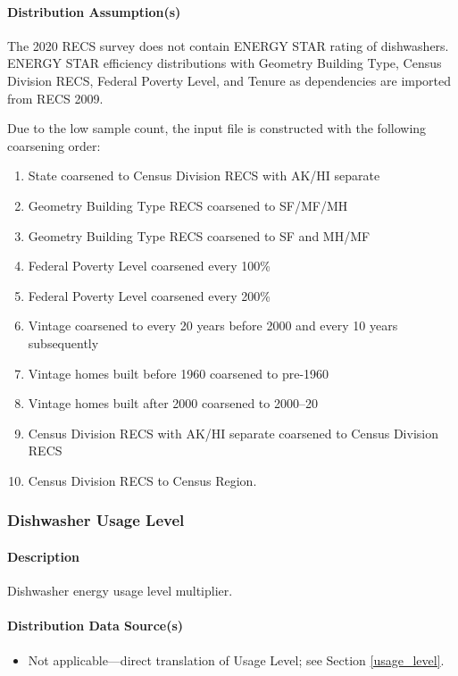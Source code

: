 \paragraph{Distribution Assumption(s)}
The 2020 RECS survey does not contain ENERGY STAR rating of dishwashers. ENERGY STAR efficiency distributions with Geometry Building Type, Census Division RECS, Federal Poverty Level, and Tenure as dependencies are imported from RECS 2009.

Due to the low sample count, the input file is constructed with the following coarsening order:
\begin{enumerate}
    \item State coarsened to Census Division RECS with AK/HI separate 
    \item Geometry Building Type RECS coarsened to SF/MF/MH 
    \item  Geometry Building Type RECS coarsened to SF and MH/MF
    \item Federal Poverty Level coarsened every 100\% 
    \item Federal Poverty Level coarsened every 200\% 
    \item Vintage coarsened to every 20 years before 2000 and every 10 years subsequently
    \item  Vintage homes built before 1960 coarsened to pre-1960 
    \item  Vintage homes built after 2000 coarsened to 2000--20 
    \item  Census Division RECS with AK/HI separate coarsened to Census Division RECS 
    \item Census Division RECS to Census Region.
\end{enumerate}

\subsubsection{Dishwasher Usage Level}\label{dishwasher_usage_level}
\paragraph{Description}
Dishwasher energy usage level multiplier.

\paragraph{Distribution Data Source(s)}
\begin{itemize}
\item 
Not applicable---direct translation of  Usage Level; see Section \ref{usage_level}.
\end{itemize}

